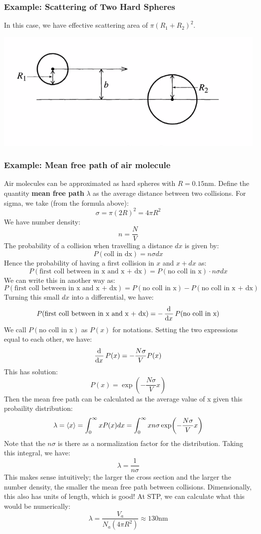 \documentclass[../PHYS306Notes.tex]{subfiles}
\begin{document}
\subsubsection{Example: Scattering of Two Hard Spheres}
In this case, we have effective scattering area of $\pi(R_1 + R_2)^2$.
\begin{center}
    \includegraphics[scale=0.7]{Lecture-27/l27-img6.png}
\end{center}

\subsubsection{Example: Mean free path of air molecule}
Air molecules can be approximated as hard spheres with $R = 0.15\text{nm}$. Define the quantity \textbf{mean free path} $\lambda$ as the average distance between two collisions. For sigma, we take (from the formula above):
\[\sigma = \pi(2R)^2 = 4\pi R^2\]
We have number density:
\[n = \frac{N}{V}\]
The probability of a collision when travelling a distance $dx$ is given by:
\[P(\text{coll in dx}) = n\sigma dx\]
Hence the probability of having a first collision in $x$ and $x + dx$ as:
\[P(\text{first coll between in x and x + dx}) = P(\text{no coll in x})\cdot n \sigma dx\]
We can write this in another way as:
\[P(\text{first coll between in x and x + dx}) = P(\text{no coll in x}) - P(\text{no coll in x + dx})\]
Turning this small $dx$ into a differential, we have:
\[P(\text{first coll between in x and x + dx}) = -\dod{}{x}P(\text{no coll in x})\]
We call $P(\text{no coll in x})$ as $P(x)$ for notations. Setting the two expressions equal to each other, we have:
\[\dod{}{x}P(x) = -\frac{N\sigma}{V}P(x)\]
This has solution:
\[P(x) = \exp(-\frac{N\sigma}{V}x)\]
Then the mean free path can be calculated as the average value of x given this probaility distribution:
\[\lambda = \left< x \right> = \int_{0}^{\infty}xP(x)dx = \int_0^\infty xn\sigma \exp(-\frac{N\sigma}{V}x)\]
Note that the $n\sigma$ is there as a normalization factor for the distribution. Taking this integral, we have:
\[\lambda = \frac{1}{n\sigma}\]
This makes sense intuitively; the larger the cross section and the larger the number density, the smaller the mean free path between collisions. Dimensionally, this also has units of length, which is good! At STP, we can calculate what this would be numerically:
\[\lambda = \frac{V_a}{N_a(4\pi R^2)} \approx 130\text{nm}\]
\end{document}
